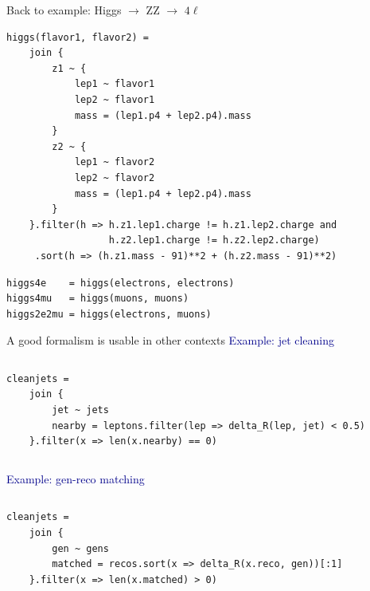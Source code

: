 \documentclass[aspectratio=169]{beamer}
\begin{document}
\begin{frame}[fragile]{Back to example: Higgs $\to$ ZZ $\to$ $4\ell$}
\small
\begin{verbatim}
higgs(flavor1, flavor2) =
    join {
        z1 ~ {
            lep1 ~ flavor1
            lep2 ~ flavor1
            mass = (lep1.p4 + lep2.p4).mass
        }
        z2 ~ {
            lep1 ~ flavor2
            lep2 ~ flavor2
            mass = (lep1.p4 + lep2.p4).mass
        }
    }.filter(h => h.z1.lep1.charge != h.z1.lep2.charge and
                  h.z2.lep1.charge != h.z2.lep2.charge)
     .sort(h => (h.z1.mass - 91)**2 + (h.z2.mass - 91)**2)
\end{verbatim}
\begin{verbatim}
higgs4e    = higgs(electrons, electrons)
higgs4mu   = higgs(muons, muons)
higgs2e2mu = higgs(electrons, muons)
\end{verbatim}
\end{frame}

\begin{frame}[fragile]{A good formalism is usable in other contexts}
\small
\vspace{0.35 cm}
\textcolor{darkblue}{\large Example: jet cleaning}

\vspace{-0.25 cm}
\begin{columns}
\begin{verbatim}
cleanjets =
    join {
        jet ~ jets
        nearby = leptons.filter(lep => delta_R(lep, jet) < 0.5)
    }.filter(x => len(x.nearby) == 0)
\end{verbatim}
\end{columns}

\vspace{1 cm}
\textcolor{darkblue}{\large Example: gen-reco matching}

\vspace{-0.25 cm}
\begin{columns}
\begin{verbatim}
cleanjets =
    join {
        gen ~ gens
        matched = recos.sort(x => delta_R(x.reco, gen))[:1]
    }.filter(x => len(x.matched) > 0)
\end{verbatim}
\end{columns}
\end{frame}
\end{document}
